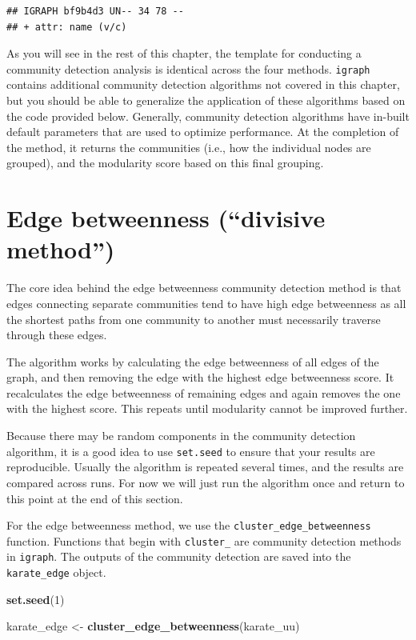 \documentclass[
]{book}
\newenvironment{Shaded}{\begin{snugshade}}{\end{snugshade}}
\newcommand{\DecValTok}[1]{\textcolor[rgb]{0.00,0.00,0.81}{#1}}
\newcommand{\FunctionTok}[1]{\textcolor[rgb]{0.13,0.29,0.53}{\textbf{#1}}}
\newcommand{\NormalTok}[1]{#1}
\newcommand{\OtherTok}[1]{\textcolor[rgb]{0.56,0.35,0.01}{#1}}
\begin{document}
\begin{verbatim}
## IGRAPH bf9b4d3 UN-- 34 78 -- 
## + attr: name (v/c)
\end{verbatim}

As you will see in the rest of this chapter, the template for conducting a community detection analysis is identical across the four methods. \texttt{igraph} contains additional community detection algorithms not covered in this chapter, but you should be able to generalize the application of these algorithms based on the code provided below. Generally, community detection algorithms have in-built default parameters that are used to optimize performance. At the completion of the method, it returns the communities (i.e., how the individual nodes are grouped), and the modularity score based on this final grouping.

\section{Edge betweenness (``divisive method'')}\label{edge-betweenness-divisive-method}

The core idea behind the edge betweenness community detection method is that edges connecting separate communities tend to have high edge betweenness as all the shortest paths from one community to another must necessarily traverse through these edges.

The algorithm works by calculating the edge betweenness of all edges of the graph, and then removing the edge with the highest edge betweenness score. It recalculates the edge betweenness of remaining edges and again removes the one with the highest score. This repeats until modularity cannot be improved further.

Because there may be random components in the community detection algorithm, it is a good idea to use \texttt{set.seed} to ensure that your results are reproducible. Usually the algorithm is repeated several times, and the results are compared across runs. For now we will just run the algorithm once and return to this point at the end of this section.

For the edge betweenness method, we use the \texttt{cluster\_edge\_betweenness} function. Functions that begin with \texttt{cluster\_} are community detection methods in \texttt{igraph}. The outputs of the community detection are saved into the \texttt{karate\_edge} object.

\begin{Shaded}
\begin{Highlighting}[]
\FunctionTok{set.seed}\NormalTok{(}\DecValTok{1}\NormalTok{)}

\NormalTok{karate\_edge }\OtherTok{\textless{}{-}} \FunctionTok{cluster\_edge\_betweenness}\NormalTok{(karate\_uu)}
\end{Highlighting}
\end{Shaded}
\end{document}
